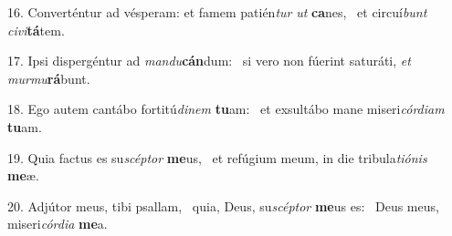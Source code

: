 16. Converténtur ad vésperam: et famem patién\textit{tur} \textit{ut} \textbf{ca}nes, \ast\  et circuí\textit{bunt} \textit{ci}\textit{vi}\textbf{tá}tem.\

17. Ipsi dispergéntur ad \textit{man}\textit{du}\textbf{cán}dum: \ast\  si vero non fúerint saturáti, \textit{et} \textit{mur}\textit{mu}\textbf{rá}bunt.\

18. Ego autem cantábo fortitú\textit{di}\textit{nem} \textbf{tu}am: \ast\  et exsultábo mane miseri\textit{cór}\textit{di}\textit{am} \textbf{tu}am.\

19. Quia factus es su\textit{scép}\textit{tor} \textbf{me}us, \ast\  et refúgium meum, in die tribula\textit{ti}\textit{ó}\textit{nis} \textbf{me}æ.\

20. Adjútor meus, tibi psallam, \dag\  quia, Deus, su\textit{scép}\textit{tor} \textbf{me}us es: \ast\  Deus meus, miseri\textit{cór}\textit{di}\textit{a} \textbf{me}a.\

